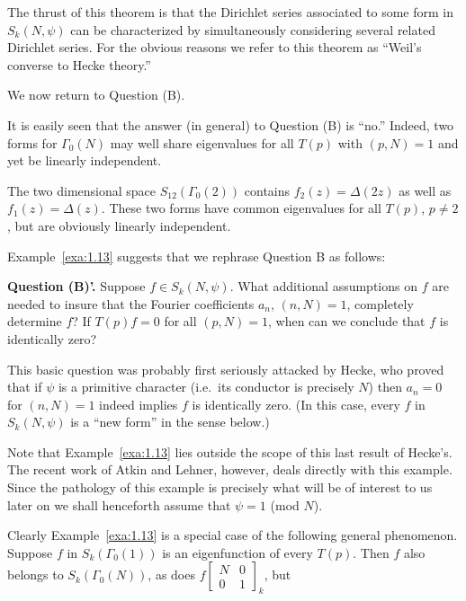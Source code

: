 The thrust of this theorem is that the Dirichlet series associated to some form in $S_k(N,\psi)$ can be characterized by simultaneously considering several related Dirichlet series. For the obvious reasons we refer to this theorem as ``Weil's converse to Hecke theory.''

We now return to Question (B).

It is easily seen that the answer (in general) to Question (B) is ``no.'' Indeed, two forms for $\Gamma_0(N)$ may well share eigenvalues for all $T(p)$ with $(p,N) = 1$ and yet be linearly independent.

\begin{example}\label{exa:1.13}

The two dimensional space $S_{12}(\Gamma_0(2))$ contains $f_2(z) = \Delta(2z)$ as well as $f_1(z) = \Delta(z)$. These two forms have common eigenvalues for all $T(p)$, $p \neq 2$, but are obviously linearly independent.

\end{example}

Example~\ref{exa:1.13} suggests that we rephrase Question B as follows:

\textbf{Question (B)'.} Suppose $f \in S_k(N,\psi)$. What additional assumptions on $f$ are needed to insure that the Fourier coefficients $a_n$, $(n,N) = 1$, completely determine $f$? If $T(p)f = 0$ for all $(p,N) = 1$, when can we conclude that $f$ is identically zero?

This basic question was probably first seriously attacked by Hecke, who proved that if $\psi$ is a primitive character (i.e.\ its conductor is precisely $N$) then $a_n = 0$ for $(n,N) = 1$ indeed implies $f$ is identically zero. (In this case, every $f$ in $S_k(N,\psi)$ is a ``new form'' in the sense below.)

Note that Example~\ref{exa:1.13} lies outside the scope of this last result of Hecke's. The recent work of Atkin and Lehner, however, deals directly with this example. Since the pathology of this example is precisely what will be of interest to us later on we shall henceforth assume that $\psi = 1$ (mod $N$).

Clearly Example~\ref{exa:1.13} is a special case of the following general phenomenon. Suppose $f$ in $S_k(\Gamma_0(1))$ is an eigenfunction of every $T(p)$. Then $f$ also belongs to $S_k(\Gamma_0(N))$, as does $f\left[\begin{array}{cc} N & 0 \\ 0 & 1 \end{array}\right]_k$, but

